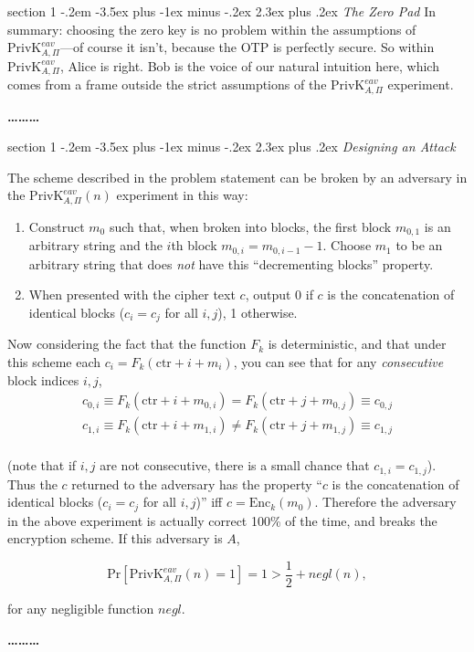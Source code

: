 \documentclass[12pt]{article}
\makeatletter
\newenvironment{problem}{\@startsection
       {section}
       {1}
       {-.2em}
       {-3.5ex plus -1ex minus -.2ex}
       {2.3ex plus .2ex}
       {\pagebreak[3]%
       \large\bf\noindent{Problem }
       }
       }
       {%
       \begin{center}\large\bf \ldots\ldots\ldots\end{center}}
\makeatother
\begin{document}
\begin{problem}{\it The Zero Pad}
In summary: choosing the zero key is no problem within the assumptions of $\text{PrivK}^{eav}_{A,\Pi}$---of course it isn't, because the OTP is perfectly secure. So within $\text{PrivK}^{eav}_{A,\Pi}$, Alice is right. Bob is the voice of our natural intuition here, which comes from a frame outside the strict assumptions of the $\text{PrivK}^{eav}_{A,\Pi}$ experiment.

\end{problem}
\begin{problem}{\it Designing an Attack}

The scheme described in the problem statement can be broken by an adversary in the $\text{PrivK}^{eav}_{A,\Pi}(n)$ experiment in this way:

\begin{enumerate}
\item Construct $m_0$ such that, when broken into blocks, the first block $m_{0,1}$ is an arbitrary string and the $i$th block $m_{0,i}=m_{0,i-1}-1$. Choose $m_1$ to be an arbitrary string that does \emph{not} have this ``decrementing blocks'' property.
\item When presented with the cipher text $c$, output 0 if $c$ is the concatenation of identical blocks ($c_i=c_j$ for all $i,j$), 1 otherwise.
\end{enumerate}

Now considering the fact that the function $F_k$ is deterministic, and that under this scheme each $c_i = F_k(\text{ctr}+i+m_i)$, you can see that for any \emph{consecutive} block indices $i,j$, 
\begin{equation}
\begin{aligned}
c_{0,i}\equiv F_k(\text{ctr} + i + m_{0,i})=F_k(\text{ctr} + j +m_{0,j}) \equiv c_{0,j}\\
c_{1,i}\equiv F_k(\text{ctr} + i + m_{1,i})\ne F_k(\text{ctr} + j +m_{1,j}) \equiv c_{1,j}\\
\end{aligned}
\end{equation}

(note that if $i,j$ are not consecutive, there is a small chance that $c_{1,i}=c_{1,j}$). Thus the $c$ returned to the adversary has the property ``$c$ is the concatenation of identical blocks ($c_i=c_j$ for all $i,j$)'' iff $c=\text{Enc}_k(m_0)$. Therefore the adversary in the above experiment is actually correct 100\% of the time, and breaks the encryption scheme. If this adversary is $A$,

\begin{equation}
\text{Pr}[\text{PrivK}^{eav}_{A,\Pi}(n)=1]=1>\frac{1}{2}+negl(n),
\end{equation}

for any negligible function $negl$.

\end{problem}
\end{document}
